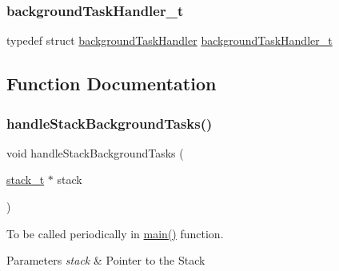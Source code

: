 \subsubsection{\texorpdfstring{backgroundTaskHandler\_t}{backgroundTaskHandler\_t}}
{\footnotesize\ttfamily typedef struct \mbox{\hyperlink{structbackground_task_handler}{background\+Task\+Handler}}  \mbox{\hyperlink{group__background_gac2e383293fae75d74beedf63afefe604}{background\+Task\+Handler\+\_\+t}}}



\subsection{Function Documentation}
\mbox{\label{group__background_gaf6bebfbbcd06181803783d2504fe318e}} 
\subsubsection{\texorpdfstring{handleStackBackgroundTasks()}{handleStackBackgroundTasks()}}
{\footnotesize\ttfamily void handle\+Stack\+Background\+Tasks (\begin{DoxyParamCaption}\item[{\mbox{\hyperlink{group__stack_ga575defe06cb6cd9e4b02d90a916721b3}{stack\+\_\+t}} $\ast$}]{stack }\end{DoxyParamCaption})}



To be called periodically in \mbox{\hyperlink{main_8c_acdef7a1fd863a6d3770c1268cb06add3}{main()}} function. 


\begin{DoxyParams}{Parameters}
{\em stack} & Pointer to the Stack \\
\hline
\end{DoxyParams}
